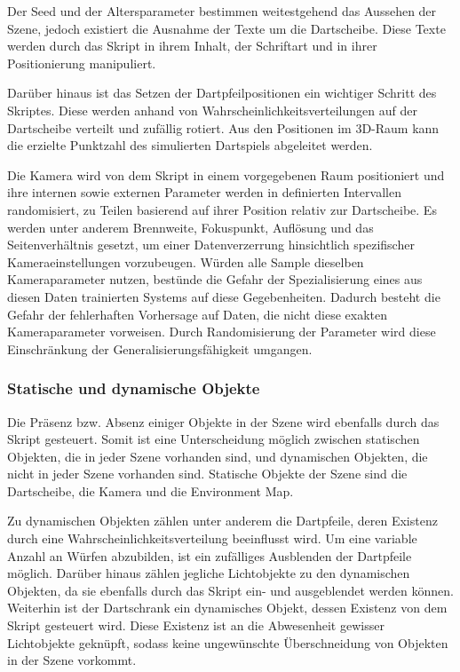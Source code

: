 Der Seed und der Altersparameter bestimmen weitestgehend das Aussehen der Szene, jedoch existiert die Ausnahme der Texte um die Dartscheibe. Diese Texte werden durch das Skript in ihrem Inhalt, der Schriftart und in ihrer Positionierung manipuliert.

Darüber hinaus ist das Setzen der Dartpfeilpositionen ein wichtiger Schritt des Skriptes. Diese werden anhand von Wahrscheinlichkeitsverteilungen auf der Dartscheibe verteilt und zufällig rotiert. Aus den Positionen im 3D-Raum kann die erzielte Punktzahl des simulierten Dartspiels abgeleitet werden.

\newpage
Die Kamera wird von dem Skript in einem vorgegebenen Raum positioniert und ihre internen sowie externen Parameter werden in definierten Intervallen randomisiert, zu Teilen basierend auf ihrer Position relativ zur Dartscheibe. Es werden unter anderem Brennweite, Fokuspunkt, Auflösung und das Seitenverhältnis gesetzt, um einer Datenverzerrung hinsichtlich spezifischer Kameraeinstellungen vorzubeugen. Würden alle Sample dieselben Kameraparameter nutzen, bestünde die Gefahr der Spezialisierung eines aus diesen Daten trainierten Systems auf diese Gegebenheiten. Dadurch besteht die Gefahr der fehlerhaften Vorhersage auf Daten, die nicht diese exakten Kameraparameter vorweisen. Durch Randomisierung der Parameter wird diese Einschränkung der Generalisierungsfähigkeit umgangen.

\subsubsection{Statische und dynamische Objekte}

Die Präsenz bzw. Absenz einiger Objekte in der Szene wird ebenfalls durch das Skript gesteuert. Somit ist eine Unterscheidung möglich zwischen statischen Objekten, die in jeder Szene vorhanden sind, und dynamischen Objekten, die nicht in jeder Szene vorhanden sind. Statische Objekte der Szene sind die Dartscheibe, die Kamera und die Environment Map.

Zu dynamischen Objekten zählen unter anderem die Dartpfeile, deren Existenz durch eine Wahrscheinlichkeitsverteilung beeinflusst wird. Um eine variable Anzahl an Würfen abzubilden, ist ein zufälliges Ausblenden der Dartpfeile möglich. Darüber hinaus zählen jegliche Lichtobjekte zu den dynamischen Objekten, da sie ebenfalls durch das Skript ein- und ausgeblendet werden können. Weiterhin ist der Dartschrank ein dynamisches Objekt, dessen Existenz von dem Skript gesteuert wird. Diese Existenz ist an die Abwesenheit gewisser Lichtobjekte geknüpft, sodass keine ungewünschte Überschneidung von Objekten in der Szene vorkommt.

